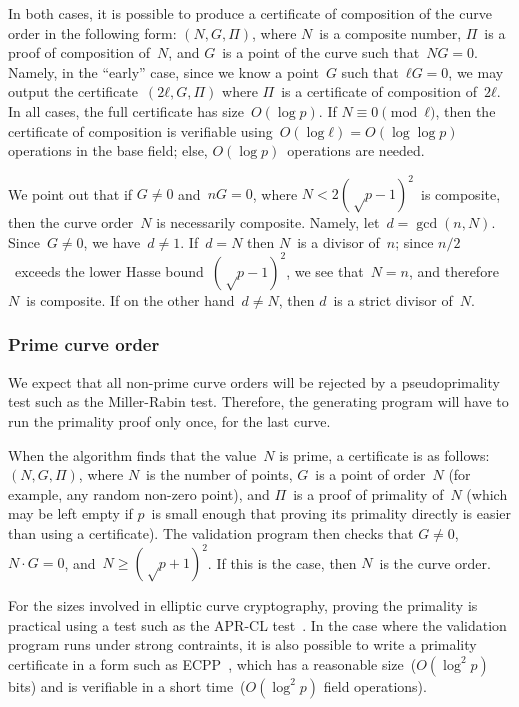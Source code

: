 \documentclass[twocolumn,letterpaper]{article}
\begin{document}
In both cases, it is possible to produce a certificate of composition
of the curve order in the following form: $(N, G, Π)$,
where $N$~is a composite number,%
$Π$~is a proof of composition of~$N$,
and $G$~is a point of the curve such that~$N G = 0$.
Namely, in the “early” case, since we know a point~$G$ such that~$ℓ G = 0$,
we may output the certificate~$(2 ℓ, G, Π)$
where $Π$~is a certificate of composition of~$2 ℓ$.
In all cases, the full certificate has size~$O(\log p)$.
If $N ≡ 0 \pmod{ℓ}$, then the certificate of composition
is verifiable using~$O(\log ℓ) = O(\log \log p)$ operations in the base field;
else, $O(\log p)$~operations are needed.

We point out that if $G ≠ 0$ and~$n G = 0$, where
$N < 2 (√p-1)^2$~is composite,
then the curve order~$N$ is necessarily composite.
Namely, let~$d = \gcd(n, N)$. Since~$G ≠ 0$, we have~$d ≠ 1$.
If~$d = N$ then $N$~is a divisor of~$n$;
since $n/2$~exceeds the lower Hasse bound~$(√p-1)^2$,
we see that~$N = n$, and therefore $N$~is composite.
If on the other hand~$d ≠ N$, then $d$~is a strict divisor of~$N$.

\subsubsection{Prime curve order}
We expect that all non-prime curve orders
will be rejected by a pseudoprimality test such as the Miller-Rabin test.
Therefore, the generating program will have to run the primality proof
only once, for the last curve.

When the algorithm finds that the value~$N$ is prime,
a certificate is as follows: $(N, G, Π)$,
where $N$~is the number of points,
$G$~is a point of order~$N$ (for example, any random non-zero point),
and $Π$~is a proof of primality of~$N$
(which may be left empty if $p$~is small enough
that proving its primality directly is easier than using a certificate).
The validation program then checks that $G ≠ 0$,
$N · G = 0$, and~$N ≥ (√p+1)^2$.
If this is the case, then $N$~is the curve order.

For the sizes involved in elliptic curve cryptography,
proving the primality is practical using a test such as
the APR-CL test~\cite{fcs1980adleman,mathcomp1984cl}.
In the case where the validation program runs under strong contraints,
it is also possible to write a primality certificate
in a form such as ECPP~\cite{mathcomp1993am},
which has a reasonable size~($O(\log^2 p)$ bits)
and is verifiable in a short time~($O(\log^2 p)$ field operations).
\end{document}
